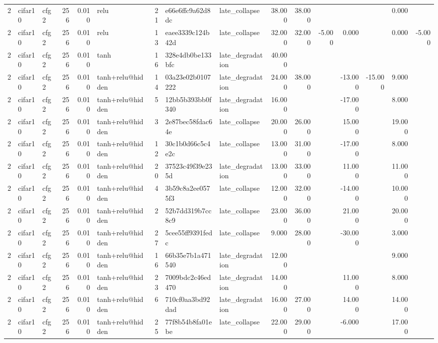 \begin{table}[htbp]
{\begin{tabular}{@{}rllrrlrllrrrrrrr@{}}
2 & cifar10 & cfg2 & 256 & 0.010 & relu & 21 & e66e6ffc9a62d8dc & late\_collapse & 38.000 & 38.000 &  &  &  & 0.000 &  \\
2 & cifar10 & cfg2 & 256 & 0.010 & relu & 13 & eaee3339c124b42d & late\_collapse & 32.000 & 32.000 & -5.000 & 0.000 &  & 0.000 & -5.000 \\
2 & cifar10 & cfg2 & 256 & 0.010 & tanh & 16 & 328e4db0be133bfc & late\_degradation & 40.000 &  &  &  &  &  &  \\
2 & cifar10 & cfg2 & 256 & 0.010 & tanh+relu@hidden & 14 & 03a23e02b0107222 & late\_degradation & 24.000 & 38.000 &  & -13.000 & -15.000 & 9.000 &  \\
2 & cifar10 & cfg2 & 256 & 0.010 & tanh+relu@hidden & 5 & 12bb5b393bb0f340 & late\_degradation & 16.000 &  &  & -17.000 &  & 8.000 &  \\
2 & cifar10 & cfg2 & 256 & 0.010 & tanh+relu@hidden & 3 & 2e87bec58fdac64e & late\_collapse & 20.000 & 26.000 &  & 15.000 &  & 19.000 &  \\
2 & cifar10 & cfg2 & 256 & 0.010 & tanh+relu@hidden & 12 & 30c1b0d66c5c4e2c & late\_collapse & 13.000 & 31.000 &  & -17.000 &  & 8.000 &  \\
2 & cifar10 & cfg2 & 256 & 0.010 & tanh+relu@hidden & 20 & 37523c49f39e235d & late\_degradation & 13.000 & 33.000 &  & 11.000 &  & 11.000 &  \\
2 & cifar10 & cfg2 & 256 & 0.010 & tanh+relu@hidden & 4 & 3b59c8a2ee0575f3 & late\_collapse & 12.000 & 32.000 &  & -14.000 &  & 10.000 &  \\
2 & cifar10 & cfg2 & 256 & 0.010 & tanh+relu@hidden & 2 & 52b7dd319b7cc8c9 & late\_collapse & 23.000 & 36.000 &  & 21.000 &  & 20.000 &  \\
2 & cifar10 & cfg2 & 256 & 0.010 & tanh+relu@hidden & 27 & 5cee55ff9391fedc & late\_collapse & 9.000 & 28.000 &  & -30.000 &  & 3.000 &  \\
2 & cifar10 & cfg2 & 256 & 0.010 & tanh+relu@hidden & 16 & 66b35e7b1a471540 & late\_degradation & 12.000 &  &  &  &  & 9.000 &  \\
2 & cifar10 & cfg2 & 256 & 0.010 & tanh+relu@hidden & 23 & 7009bdc2c46ed470 & late\_degradation & 14.000 &  &  & 11.000 &  & 8.000 &  \\
2 & cifar10 & cfg2 & 256 & 0.010 & tanh+relu@hidden & 6 & 710cf0aa3bd92dad & late\_degradation & 16.000 & 27.000 &  & 14.000 &  & 14.000 &  \\
2 & cifar10 & cfg2 & 256 & 0.010 & tanh+relu@hidden & 25 & 77f8b54b8fa01ebe & late\_collapse & 22.000 & 29.000 &  & -6.000 &  & 17.000 &  \\

\end{tabular}}
\end{table}

